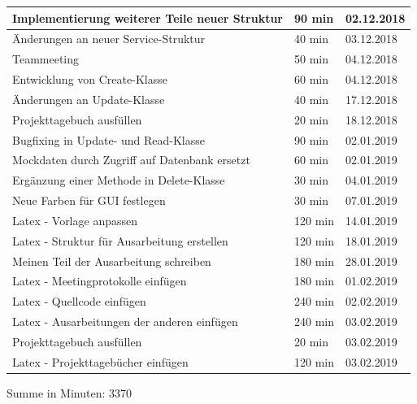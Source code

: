 \begin{longtable}{|p{10cm}|p{2cm}|p{2cm}|}
Implementierung weiterer Teile neuer Struktur & 90 min & 02.12.2018 \\ \hline
Änderungen an neuer Service-Struktur & 40 min & 03.12.2018 \\ \hline
Teammeeting & 50 min & 04.12.2018 \\ \hline
Entwicklung von Create-Klasse & 60 min & 04.12.2018 \\ \hline
Änderungen an Update-Klasse & 40 min & 17.12.2018 \\ \hline
Projekttagebuch ausfüllen & 20 min & 18.12.2018 \\ \hline
Bugfixing in Update- und Read-Klasse & 90 min & 02.01.2019 \\ \hline
Mockdaten durch Zugriff auf Datenbank ersetzt & 60 min & 02.01.2019 \\ \hline
Ergänzung einer Methode in Delete-Klasse & 30 min & 04.01.2019 \\ \hline
Neue Farben für GUI festlegen & 30 min & 07.01.2019 \\ \hline
Latex - Vorlage anpassen & 120 min & 14.01.2019 \\ \hline
Latex - Struktur für Ausarbeitung erstellen & 120 min & 18.01.2019 \\ \hline
Meinen Teil der Ausarbeitung schreiben & 180 min & 28.01.2019 \\ \hline
Latex - Meetingprotokolle einfügen & 180 min & 01.02.2019 \\ \hline
Latex - Quellcode einfügen & 240 min & 02.02.2019 \\ \hline
Latex - Ausarbeitungen der anderen einfügen & 240 min & 03.02.2019 \\ \hline
Projekttagebuch ausfüllen & 20 min & 03.02.2019 \\ \hline
Latex - Projekttagebücher einfügen & 120 min & 03.02.2019 \\ \hline
\end{longtable}
Summe in Minuten: 3370

\newpage
